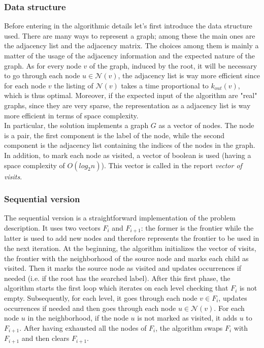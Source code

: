 \subsubsection{Data structure}
Before entering in the algorithmic details let's first introduce the data structure used.
There are many ways to represent a graph; among these the main ones are the adjacency list and the adjacency
matrix. The choices among them is mainly a matter of the usage of the adjacency information and the 
expected nature of the graph. As for every node $v$ of the graph, induced by the root, it will be necessary
to go through each node $u \in \mathcal{N}(v)$, the adjacency list is way more efficient since for each
node $v$ the listing of $\mathcal{N}(v)$ takes a time proportional to $k_{out}(v)$, which is thus optimal.
Moreover, if the expected input of the algorithm are "real" graphs, since they are very sparse, the representation as a adjacency list is way 
more efficient in terms of space complexity.
\\
In particular, the solution implements a graph $G$ as a vector of nodes.
 The node is a pair, the first component is the label of the node, while the second
 component is the adjacency list containing the indices of the nodes in the graph.
In addition, to mark each node as visited, a vector of boolean is used (having a space complexity of $O(log_2n)$). This vector is called in the report 
\textit{vector of visits}.

 \subsubsection{Sequential version}
\label{sub:seq-version}
The sequential version is a straightforward implementation of the problem
description. It uses two vectors $F_i$ and $F_{i+1}$: the former is the frontier 
while the latter is used to add new nodes and therefore represents the frontier 
to be used in the next iteration. At the beginning, the algorithm initializes the vector of visits,
 the frontier with the neighborhood of the source node and marks each child as visited. Then it marks the source node 
as visited and updates occurrences if needed (i.e. if the root has the searched label). After this first phase,
 the algorithm starts the first loop which iterates on each level checking that $F_i$ is not empty.
 Subsequently, for each level, it goes through each node $v \in F_i$, updates occurrences if needed and
 then goes through each node $u \in \mathcal{N}(v)$.
 For each node $u$ in the neighborhood, if the node $u$ is not marked as visited, 
 it adds $u$ to $F_{i+1}$. After having exhausted all the nodes of $F_i$, the algorithm
 swaps $F_i$ with $F_{i+1}$ and then clears $F_{i+1}$.

